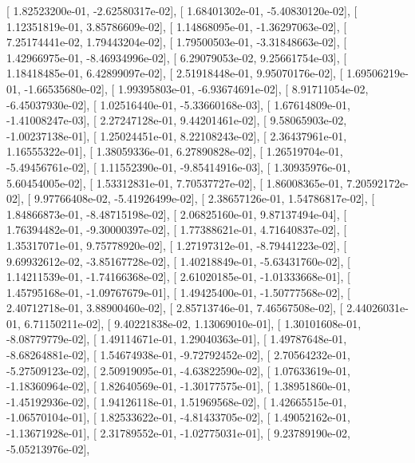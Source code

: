\documentclass{article}
\begin{document}
       [  1.82523200e-01,  -2.62580317e-02],
       [  1.68401302e-01,  -5.40830120e-02],
       [  1.12351819e-01,   3.85786609e-02],
       [  1.14868095e-01,  -1.36297063e-02],
       [  7.25174441e-02,   1.79443204e-02],
       [  1.79500503e-01,  -3.31848663e-02],
       [  1.42966975e-01,  -8.46934996e-02],
       [  6.29079053e-02,   9.25661754e-03],
       [  1.18418485e-01,   6.42899097e-02],
       [  2.51918448e-01,   9.95070176e-02],
       [  1.69506219e-01,  -1.66535680e-02],
       [  1.99395803e-01,  -6.93674691e-02],
       [  8.91711054e-02,  -6.45037930e-02],
       [  1.02516440e-01,  -5.33660168e-03],
       [  1.67614809e-01,  -1.41008247e-03],
       [  2.27247128e-01,   9.44201461e-02],
       [  9.58065903e-02,  -1.00237138e-01],
       [  1.25024451e-01,   8.22108243e-02],
       [  2.36437961e-01,   1.16555322e-01],
       [  1.38059336e-01,   6.27890828e-02],
       [  1.26519704e-01,  -5.49456761e-02],
       [  1.11552390e-01,  -9.85414916e-03],
       [  1.30935976e-01,   5.60454005e-02],
       [  1.53312831e-01,   7.70537727e-02],
       [  1.86008365e-01,   7.20592172e-02],
       [  9.97766408e-02,  -5.41926499e-02],
       [  2.38657126e-01,   1.54786817e-02],
       [  1.84866873e-01,  -8.48715198e-02],
       [  2.06825160e-01,   9.87137494e-04],
       [  1.76394482e-01,  -9.30000397e-02],
       [  1.77388621e-01,   4.71640837e-02],
       [  1.35317071e-01,   9.75778920e-02],
       [  1.27197312e-01,  -8.79441223e-02],
       [  9.69932612e-02,  -3.85167728e-02],
       [  1.40218849e-01,  -5.63431760e-02],
       [  1.14211539e-01,  -1.74166368e-02],
       [  2.61020185e-01,  -1.01333668e-01],
       [  1.45795168e-01,  -1.09767679e-01],
       [  1.49425400e-01,  -1.50777568e-02],
       [  2.40712718e-01,   3.88900460e-02],
       [  2.85713746e-01,   7.46567508e-02],
       [  2.44026031e-01,   6.71150211e-02],
       [  9.40221838e-02,   1.13069010e-01],
       [  1.30101608e-01,  -8.08779779e-02],
       [  1.49114671e-01,   1.29040363e-01],
       [  1.49787648e-01,  -8.68264881e-02],
       [  1.54674938e-01,  -9.72792452e-02],
       [  2.70564232e-01,  -5.27509123e-02],
       [  2.50919095e-01,  -4.63822590e-02],
       [  1.07633619e-01,  -1.18360964e-02],
       [  1.82640569e-01,  -1.30177575e-01],
       [  1.38951860e-01,  -1.45192936e-02],
       [  1.94126118e-01,   1.51969568e-02],
       [  1.42665515e-01,  -1.06570104e-01],
       [  1.82533622e-01,  -4.81433705e-02],
       [  1.49052162e-01,  -1.13671928e-01],
       [  2.31789552e-01,  -1.02775031e-01],
       [  9.23789190e-02,  -5.05213976e-02],
\end{document}
